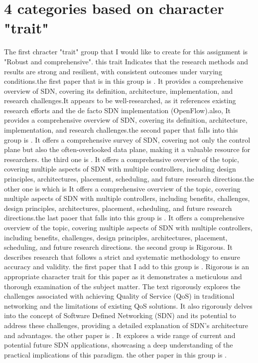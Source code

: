 \documentclass{article}
\begin{document}
\section{4 categories based on character "trait"}
The first chracter "trait" group that I would like to create for this assignment is "Robust and comprehensive". this trait Indicates that the research methods and results are strong and resilient, with consistent outcomes under varying conditions.the first paper that is in this group is \cite{xia2014survey}. It provides a comprehensive overview of SDN, covering its definition, architecture, implementation, and research challenges.It appears to be well-researched, as it references existing research efforts and the de facto SDN implementation (OpenFlow).also, It provides a comprehensive overview of SDN, covering its definition, architecture, implementation, and research challenges.the second paper that falls into this group is \cite{farhady2015software}. It offers a comprehensive survey of SDN, covering not only the control plane but also the often-overlooked data plane, making it a valuable resource for researchers. the third one is \cite{zhang2018survey}. It offers a comprehensive overview of the topic, covering multiple aspects of SDN with multiple controllers, including design principles, architectures, placement, scheduling, and future research directions.the other one is \cite{cox2017advancing} which is It offers a comprehensive overview of the topic, covering multiple aspects of SDN with multiple controllers, including benefits, challenges, design principles, architectures, placement, scheduling, and future research directions.the last paoer that falls into this group is \cite{cox2017advancing}. It offers a comprehensive overview of the topic, covering multiple aspects of SDN with multiple controllers, including benefits, challenges, design principles, architectures, placement, scheduling, and future research directions.
the second group is Rigorous. It describes research that follows a strict and systematic methodology to ensure accuracy and validity.
the first paper that I add to this group is \cite{karakus2017quality} . 
Rigorous is an appropriate character trait for this paper as it demonstrates a meticulous and thorough examination of the subject matter. The text rigorously explores the challenges associated with achieving Quality of Service (QoS) in traditional networking and the limitations of existing QoS solutions. It also rigorously delves into the concept of Software Defined Networking (SDN) and its potential to address these challenges, providing a detailed explanation of SDN's architecture and advantages. the other paper is \cite{nunes2014survey}. It explores a wide range of current and potential future SDN applications, showcasing a deep understanding of the practical implications of this paradigm. the other paper in this group is \cite{jammal2014software}. 
\end{document}

